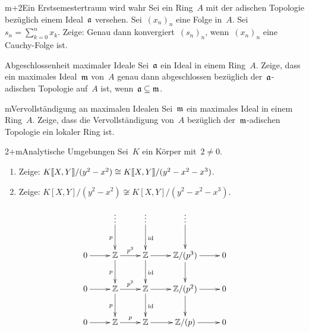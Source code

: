 \documentclass{uebblatt}
\begin{document}

\begin{aufgabe}{m+2}{Ein Erstsemestertraum wird wahr}
Sei ein Ring~$A$ mit der adischen Topologie bezüglich einem
Ideal~$\mathfrak{a}$ versehen.
Sei~$(x_n)_n$ eine Folge in~$A$. Sei~$s_n = \sum_{k=0}^n x_k$.
Zeige: Genau dann konvergiert~$(s_n)_n$,
wenn~$(x_n)_n$ eine Cauchy-Folge ist.
\end{aufgabe}


\begin{aufgabe}{3}{Abgeschlossenheit maximaler Ideale}
Sei~$\mathfrak{a}$ ein Ideal in einem Ring~$A$. Zeige, dass ein maximales Ideal~$\mathfrak{m}$
von~$A$ genau dann abgeschlossen bezüglich der~$\mathfrak{a}$-adischen Topologie
auf~$A$ ist, wenn~$\mathfrak{a} \subseteq \mathfrak{m}$.
\end{aufgabe}

\begin{aufgabe}{m}{Vervollständigung an maximalen Idealen}
Sei~$\mathfrak{m}$ ein maximales Ideal in einem Ring~$A$. Zeige, dass die
Vervollständigung von~$A$ bezüglich der~$\mathfrak{m}$-adischen Topologie ein lokaler
Ring ist.
\end{aufgabe}

\begin{aufgabe}{2+m}{Analytische Umgebungen}
Sei~$K$ ein Körper mit~$2 \neq 0$.
\begin{enumerate}
\item Zeige: ${K}\llbracket{X,Y}\rrbracket/(y^2-x^2) \cong {K}\llbracket{X,Y}\rrbracket/(y^2-x^2-x^3)$.
\item Zeige: $K[X,Y]/(y^2-x^2) \not\cong K[X,Y]/(y^2-x^2-x^3)$.
\end{enumerate}
\end{aufgabe}

\setlength{\wrapoverhang}{1.3cm}
\setlength{\columnsep}{0.8cm}
\begin{figure}
  \vspace{-6em}
  \scriptsize
  \[ \xymatrix{
    & \vdots \ar[d]_p & \vdots \ar[d]^\id & \vdots \ar[d] \\
    0 \ar[r] & \ZZ \ar[r]^{p^3}\ar[d]_p & \ZZ \ar[r]\ar[d]^\id & \ZZ/(p^3) \ar[r]\ar[d] & 0 \\
    0 \ar[r] & \ZZ \ar[r]^{p^2}\ar[d]_p & \ZZ \ar[r]\ar[d]^\id & \ZZ/(p^2) \ar[r]\ar[d] & 0 \\
    0 \ar[r] & \ZZ \ar[r]^p & \ZZ \ar[r] & \ZZ/(p) \ar[r] & 0
  } \]
\end{figure}
\end{document}
